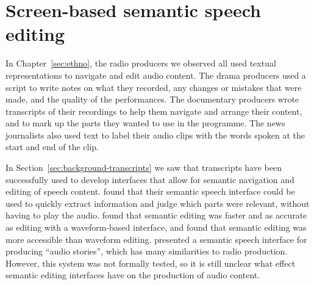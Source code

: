 \chapter{Screen-based semantic speech editing}\label{sec:screen}

In Chapter~\ref{sec:ethno}, the radio producers we observed all used textual representations to navigate and edit audio
content. The drama producers used a script to write notes on what they recorded, any changes or mistakes that were made, and the
quality of the performances. The documentary producers wrote transcripts of their recordings to help them navigate and
arrange their content, and to mark up the parts they wanted to use in the programme. The news journalists also used
text to label their audio clips with the words spoken at the start and end of the clip.

In Section~\ref{sec:background-transcripts} we saw that transcripts have been successfully used to develop interfaces
that allow for semantic navigation and editing of speech content.  \citet{Whittaker2002} found that their semantic
speech interface could be used to quickly extract information and judge which parts were relevant, without having to
play the audio.  \citet{Whittaker2004} found that semantic editing was faster and as accurate as editing with a
waveform-based interface, and \citet{Sivaraman2016} found that semantic editing was more accessible than waveform
editing.  \citet{Rubin2013} presented a semantic speech interface for producing ``audio stories'', which has many
similarities to radio production. However, this system was not formally tested, so it is still unclear what effect
semantic editing interfaces have on the production of audio content.

